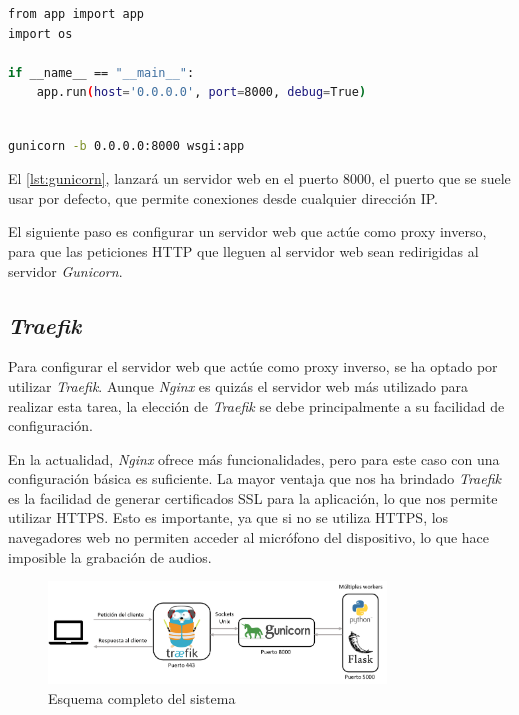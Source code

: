 \begin{lstlisting}[language=bash, caption={Código guardado en 'wsgi.py'.}, label={lst:wsgi}]
from app import app
import os

if __name__ == "__main__":
    app.run(host='0.0.0.0', port=8000, debug=True)
    

\end{lstlisting}

\newpage

\begin{lstlisting}[language=bash, caption={Comando para lanzar la aplicación con \textit{Gunicorn}.}, label={lst:gunicorn}]
    gunicorn -b 0.0.0.0:8000 wsgi:app
\end{lstlisting}

El \autoref{lst:gunicorn}, lanzará un servidor web en el puerto 8000, el puerto que se suele usar por defecto, que permite conexiones desde cualquier dirección IP.

El siguiente paso es configurar un servidor web que actúe como proxy inverso, para que las peticiones HTTP que lleguen al servidor web sean redirigidas al servidor \textit{Gunicorn}.


\subsection{\textit{Traefik}}
Para configurar el servidor web que actúe como proxy inverso, se ha optado por utilizar \textit{Traefik}.
Aunque \textit{Nginx} es quizás el servidor web más utilizado para realizar esta tarea, la elección de \textit{Traefik} se debe principalmente a su facilidad de configuración.

En la actualidad, \textit{Nginx} ofrece más funcionalidades, pero para este caso con una configuración básica es suficiente.
La mayor ventaja que nos ha brindado \textit{Traefik} es la facilidad de generar certificados SSL para la aplicación, lo que nos permite utilizar HTTPS.
Esto es importante, ya que si no se utiliza HTTPS, los navegadores web no permiten acceder al micrófono del dispositivo, lo que hace imposible la grabación de audios.

\begin{figure}[htpb]
    \centering
    \includegraphics[width=0.8\textwidth]{cap3/images/arquitectura.png}
    \caption{Esquema completo del sistema}
    \label{fig:traefik}
    
\end{figure}



